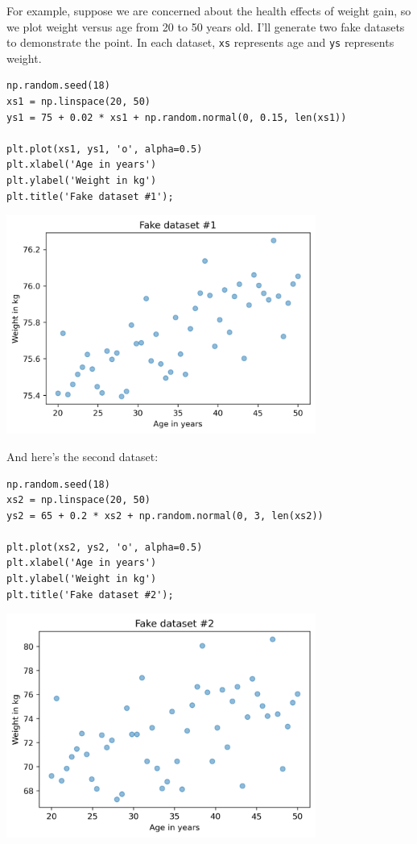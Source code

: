 For example, suppose we are concerned about the health effects of weight
gain, so we plot weight versus age from 20 to 50 years old. I'll
generate two fake datasets to demonstrate the point. In each dataset,
\passthrough{\lstinline!xs!} represents age and
\passthrough{\lstinline!ys!} represents weight.

\begin{lstlisting}[]
np.random.seed(18)
xs1 = np.linspace(20, 50)
ys1 = 75 + 0.02 * xs1 + np.random.normal(0, 0.15, len(xs1))

plt.plot(xs1, ys1, 'o', alpha=0.5)
plt.xlabel('Age in years')
plt.ylabel('Weight in kg')
plt.title('Fake dataset #1');
\end{lstlisting}

\begin{center}
\includegraphics[width=4in]{09_relationships_files/09_relationships_67_0.png}
\end{center}

And here's the second dataset:

\begin{lstlisting}[]
np.random.seed(18)
xs2 = np.linspace(20, 50)
ys2 = 65 + 0.2 * xs2 + np.random.normal(0, 3, len(xs2))

plt.plot(xs2, ys2, 'o', alpha=0.5)
plt.xlabel('Age in years')
plt.ylabel('Weight in kg')
plt.title('Fake dataset #2');
\end{lstlisting}

\begin{center}
\includegraphics[width=4in]{09_relationships_files/09_relationships_69_0.png}
\end{center}

